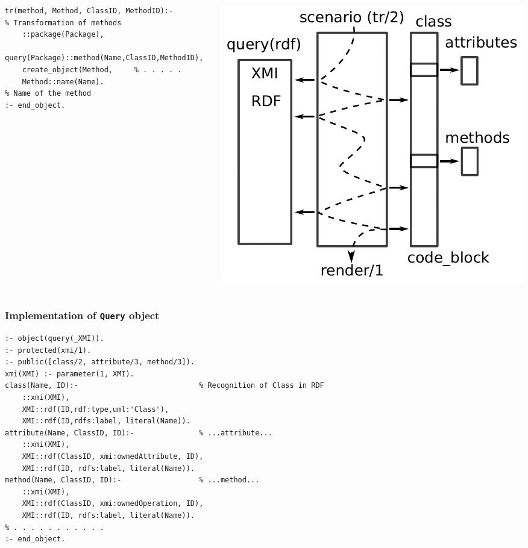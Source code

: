 \documentclass[10pt]{beamer}
\begin{document}
\begin{frame}[fragile]
\begin{columns}
\begin{column}{0.6\textwidth}
\begin{verbatim}
tr(method, Method, ClassID, MethodID):-              % Transformation of methods
    ::package(Package),
    query(Package)::method(Name,ClassID,MethodID),
    create_object(Method,     % . . . . .
    Method::name(Name).                              % Name of the method
:- end_object.
\end{verbatim}
    \end{column}
    \begin{column}{0.4\linewidth}
      \includegraphics[width=1\linewidth]{scenario.pdf}
    \end{column}
  \end{columns}
\end{frame}

\begin{frame}[fragile]
  \frametitle{Implementation of \texttt{Query} object}
\begin{verbatim}
:- object(query(_XMI)).
:- protected(xmi/1).
:- public([class/2, attribute/3, method/3]).
xmi(XMI) :- parameter(1, XMI).
class(Name, ID):-                            % Recognition of Class in RDF
    ::xmi(XMI),
    XMI::rdf(ID,rdf:type,uml:'Class'),
    XMI::rdf(ID,rdfs:label, literal(Name)).
attribute(Name, ClassID, ID):-               % ...attribute...
    ::xmi(XMI),
    XMI::rdf(ClassID, xmi:ownedAttribute, ID),
    XMI::rdf(ID, rdfs:label, literal(Name)).
method(Name, ClassID, ID):-                  % ...method...
    ::xmi(XMI),
    XMI::rdf(ClassID, xmi:ownedOperation, ID),
    XMI::rdf(ID, rdfs:label, literal(Name)).
% . . . . . . . . . . .
:- end_object.
\end{verbatim}
\end{frame}
\end{document}
